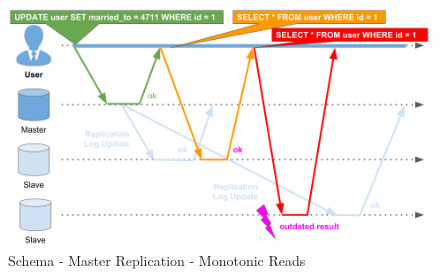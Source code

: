 {\begin{figure}[H]
	\centering
  \includegraphics[width=1\textwidth]{replication_schema_sl_monotonic_reads.png}
	\caption{Schema - Master Replication - Monotonic Reads}
	\label{schema_replication_sl_monotonic_reads}
\end{figure}

}
